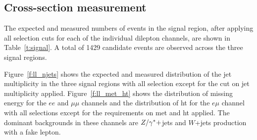 

\subsection{Cross-section measurement}
\label{s:nobtagging}


The expected and measured numbers of events in the signal region,
after applying all selection cuts for each of the individual
dilepton channels, are shown in Table~\ref{t:signal}. A total of
1429 %
candidate events are observed across the three signal regions.



Figure~\ref{f:ll_njets} shows the expected and measured distribution
of the jet multiplicity in the three signal regions with all selection
except for the cut on jet multiplicity applied.
Figure~\ref{f:ll_met_ht} shows the distribution of missing energy for the
$ee$ and $\mu\mu$ channels and the distribution of ht for the $e\mu$
channel with all selections except for the requirements on met and
ht applied.
The dominant backgrounds in these channels are $Z/\gamma^{*} +$jets and $W$+jets
production with a fake lepton.

